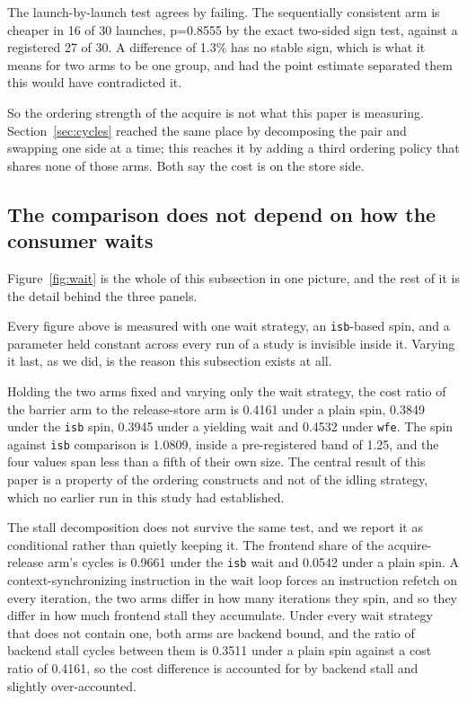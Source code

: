 \documentclass[conference]{IEEEtran}
\begin{document}
The launch-by-launch test agrees by failing. The sequentially consistent arm
is cheaper in 16 of 30 launches, p=0.8555 by the exact two-sided sign test,
against a registered 27 of 30. A difference of 1.3\% has no stable sign, which
is what it means for two arms to be one group, and had the point estimate
separated them this would have contradicted it.

So the ordering strength of the acquire is not what this paper is measuring.
Section~\ref{sec:cycles} reached the same place by decomposing the pair and
swapping one side at a time; this reaches it by adding a third ordering policy
that shares none of those arms. Both say the cost is on the store side.

\subsection{The comparison does not depend on how the consumer waits}
\label{sec:wait}

Figure~\ref{fig:wait} is the whole of this subsection in one picture, and the
rest of it is the detail behind the three panels.

Every figure above is measured with one wait strategy, an \texttt{isb}-based
spin, and a parameter held constant across every run of a study is invisible
inside it. Varying it last, as we did, is the reason this subsection exists at
all.

Holding the two arms fixed and varying only the wait strategy, the cost ratio of
the barrier arm to the release-store arm is 0.4161 under a plain spin, 0.3849
under the \texttt{isb} spin, 0.3945 under a yielding wait and 0.4532 under
\texttt{wfe}. The spin against \texttt{isb} comparison is
1.0809, inside a pre-registered band of 1.25, and the four values span less
than a fifth of their own size.
The central result of this paper is a property of the ordering constructs and
not of the idling strategy, which no earlier run in this study had established.

The stall decomposition does not survive the same test, and we report it as
conditional rather than quietly keeping it. The frontend share of the
acquire-release arm's cycles is 0.9661 under the \texttt{isb} wait and 0.0542
under a plain spin. A context-synchronizing instruction in the wait loop forces
an instruction refetch on every iteration, the two arms differ in how many
iterations they spin, and so they differ in how much frontend stall they
accumulate. Under every wait strategy that does not contain one, both arms are
backend bound, and the ratio of backend stall cycles between them is 0.3511
under a plain spin against a cost ratio of 0.4161, so the cost difference is
accounted for by backend stall and slightly over-accounted.
\end{document}
